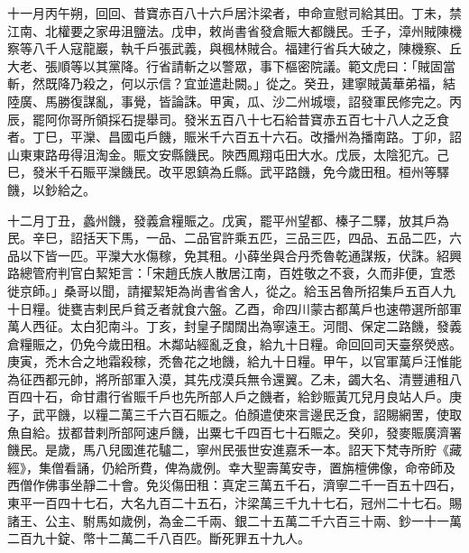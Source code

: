\begin{pinyinscope}
 十一月丙午朔，回回、昔寶赤百八十六戶居汴梁者，申命宣慰司給其田。丁未，禁江南、北權要之家毋沮鹽法。戊申，敕尚書省發倉賑大都饑民。壬子，漳州賊陳機察等八千人寇龍巖，執千戶張武義，與楓林賊合。福建行省兵大破之，陳機察、丘大老、張順等以其黨降。行省請斬之以警眾，事下樞密院議。範文虎曰：「賊固當斬，然既降乃殺之，何以示信？宜並遣赴闕。」從之。癸丑，建寧賊黃華弟福，結陸廣、馬勝復謀亂，事覺，皆論誅。甲寅，瓜、沙二州城壞，詔發軍民修完之。丙辰，罷阿你哥所領採石提舉司。發米五百八十七石給昔寶赤五百七十八人之乏食者。丁巳，平灤、昌國屯戶饑，賑米千六百五十六石。改播州為播南路。丁卯，詔山東東路毋得沮淘金。賑文安縣饑民。陜西鳳翔屯田大水。戊辰，太陰犯亢。己巳，發米千石賑平灤饑民。改平恩鎮為丘縣。武平路饑，免今歲田租。桓州等驛饑，以鈔給之。



 十二月丁丑，蠡州饑，發義倉糧賑之。戊寅，罷平州望都、榛子二驛，放其戶為民。辛巳，詔括天下馬，一品、二品官許乘五匹，三品三匹，四品、五品二匹，六品以下皆一匹。平灤大水傷稼，免其租。小薛坐與合丹禿魯乾通謀叛，伏誅。紹興路總管府判官白絜矩言：「宋趙氏族人散居江南，百姓敬之不衰，久而非便，宜悉徙京師。」桑哥以聞，請擢絜矩為尚書省舍人，從之。給玉呂魯所招集戶五百人九十日糧。徙甕吉剌民戶貧乏者就食六盤。乙酉，命四川蒙古都萬戶也速帶選所部軍萬人西征。太白犯南斗。丁亥，封皇子闊闊出為寧遠王。河間、保定二路饑，發義倉糧賑之，仍免今歲田租。木鄰站經亂乏食，給九十日糧。命回回司天臺祭熒惑。庚寅，禿木合之地霜殺稼，禿魯花之地饑，給九十日糧。甲午，以官軍萬戶汪惟能為征西都元帥，將所部軍入漠，其先戍漠兵無令還翼。乙未，蠲大名、清豐逋租八百四十石，命甘肅行省賑千戶也先所部人戶之饑者，給鈔賑黃兀兒月良站人戶。庚子，武平饑，以糧二萬三千六百石賑之。伯顏遣使來言邊民乏食，詔賜網罟，使取魚自給。拔都昔剌所部阿速戶饑，出粟七千四百七十石賑之。癸卯，發麥賑廣濟署饑民。是歲，馬八兒國進花驢二，寧州民張世安進嘉禾一本。詔天下梵寺所貯《藏經》，集僧看誦，仍給所費，俾為歲例。幸大聖壽萬安寺，置旃檀佛像，命帝師及西僧作佛事坐靜二十會。免災傷田租：真定三萬五千石，濟寧二千一百五十四石，東平一百四十七石，大名九百二十五石，汴梁萬三千九十七石，冠州二十七石。賜諸王、公主、駙馬如歲例，為金二千兩、銀二十五萬二千六百三十兩、鈔一十一萬二百九十錠、幣十二萬二千八百匹。斷死罪五十九人。



\end{pinyinscope}